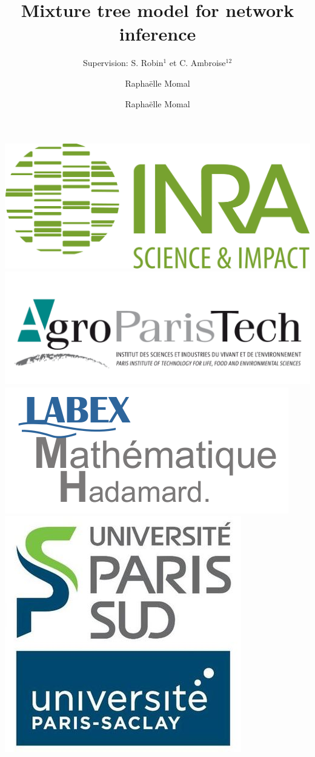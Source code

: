 \documentclass[9pt]{beamer}
\title{Mixture tree model for network inference}
\subtitle{Supervision:  S. Robin$^{1}$ et C. Ambroise$^{12}$ }
\author{Raphaëlle Momal}
\institute[]
{
  \inst{1}%
  UMR AgroParisTech / INRA MIA-Paris \\
  \inst{2}%
  LaMME, Evry
  }
\author{Raphaëlle Momal}
\begin{document}
\begin{frame}
    \titlepage
\begin{center}
\vspace{-1cm}
	\includegraphics[width=0.25\linewidth]{logo_inra.jpg}\hspace{0.1cm}
	\includegraphics[width=0.25\linewidth]{agro.PNG}
	\includegraphics[width=0.25\linewidth]{lmh.png}\hspace{0.1cm}
	\includegraphics[width=0.15\linewidth]{upsud.jpg}
    
\end{center}
\end{frame}
\end{document}
